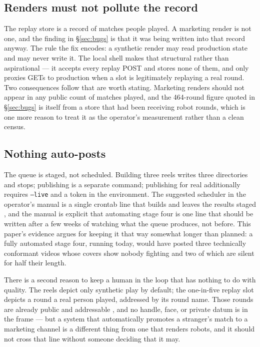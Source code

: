 \documentclass[10pt,letterpaper,twocolumn]{article}
\newcommand{\code}[1]{\texttt{#1}}
\begin{document}
\subsection{Renders must not pollute the record}

The replay store is a record of matches people played. A marketing render is not
one, and the finding in \S\ref{sec:bugs} is that it was being written into that
record anyway. The rule the fix encodes: a synthetic render may read production
state and may never write it. The local shell makes that structural rather than
aspirational --- it accepts every replay POST and stores none of them, and only
proxies GETs to production when a slot is legitimately replaying a real round.
Two consequences follow that are worth stating. Marketing renders should not
appear in any public count of matches played, and the 464-round figure quoted in
\S\ref{sec:bugs} is itself from a store that had been receiving robot rounds,
which is one more reason to treat it as the operator's measurement rather than a
clean census.

\subsection{Nothing auto-posts}

The queue is staged, not scheduled. Building three reels writes three
directories and stops; publishing is a separate command; publishing for real
additionally requires \code{--live} and a token in the environment. The
suggested scheduler in the operator's manual is a single crontab line that
builds and leaves the results staged \cite{acmarketing}, and the manual is
explicit that automating stage four is one line that should be written after a
few weeks of watching what the queue produces, not before. This paper's evidence
argues for keeping it that way somewhat longer than planned: a fully automated
stage four, running today, would have posted three technically conformant videos
whose covers show nobody fighting and two of which are silent for half their
length.

There is a second reason to keep a human in the loop that has nothing to do with
quality. The reels depict only synthetic play by default; the one-in-five replay
slot depicts a round a real person played, addressed by its round name. Those
rounds are already public and addressable \cite{scudder2026url}, and no handle,
face, or private datum is in the frame --- but a system that automatically
promotes a stranger's match to a marketing channel is a different thing from one
that renders robots, and it should not cross that line without someone deciding
that it may.
\end{document}
